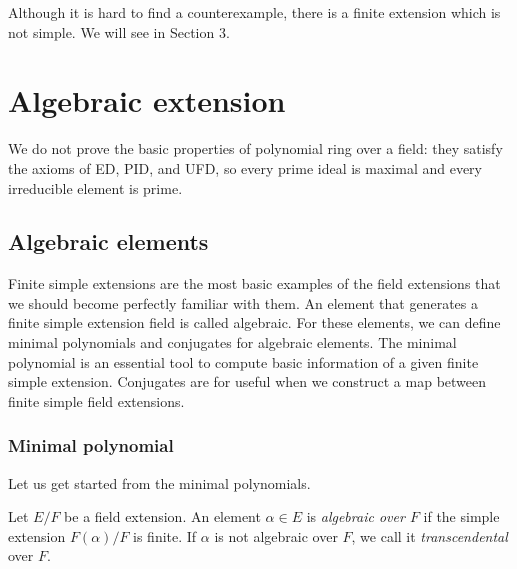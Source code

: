 \documentclass{../exp}
\begin{document}
Although it is hard to find a counterexample, there is a finite extension which is not simple.
We will see in Section 3.









\section{Algebraic extension}

We do not prove the basic properties of polynomial ring over a field: they satisfy the axioms of ED, PID, and UFD, so every prime ideal is maximal and every irreducible element is prime.

\subsection{Algebraic elements}
Finite simple extensions are the most basic examples of the field extensions that we should become perfectly familiar with them.
An element that generates a finite simple extension field is called algebraic.
For these elements, we can define minimal polynomials and conjugates for algebraic elements.
The minimal polynomial is an essential tool to compute basic information of a given finite simple extension.
Conjugates are for useful when we construct a map between finite simple field extensions.

\subsubsection{Minimal polynomial}
Let us get started from the minimal polynomials.

\begin{defn}
Let $E/F$ be a field extension.
An element $\alpha\in E$ is \emph{algebraic over $F$} if the simple extension $F(\alpha)/F$ is finite.
If $\alpha$ is not algebraic over $F$, we call it \emph{transcendental} over $F$.
\end{defn}
\end{document}
